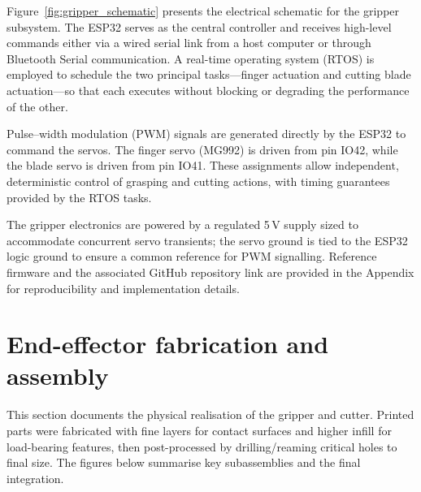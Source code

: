 Figure~\ref{fig:gripper_schematic} presents the electrical schematic for the gripper subsystem. The
ESP32 serves as the central controller and receives high-level commands either via a wired serial
link from a host computer or through Bluetooth Serial communication. A real-time operating system
(RTOS) is employed to schedule the two principal tasks—finger actuation and cutting blade
actuation—so that each executes without blocking or degrading the performance of the other.

Pulse–width modulation (PWM) signals are generated directly by the ESP32 to command the servos.
The finger servo (MG992) is driven from pin IO42, while the blade servo is driven from pin IO41.
These assignments allow independent, deterministic control of grasping and cutting actions, with
timing guarantees provided by the RTOS tasks.

The gripper electronics are powered by a regulated 5\,V supply sized to accommodate concurrent
servo transients; the servo ground is tied to the ESP32 logic ground to ensure a common reference
for PWM signalling. Reference firmware and the associated GitHub repository link are provided
in the Appendix for reproducibility and implementation details.




\section{End-effector fabrication and assembly}

This section documents the physical realisation of the gripper and cutter. Printed parts were
fabricated with fine layers for contact surfaces and higher infill for load-bearing features, then
post-processed by drilling/reaming critical holes to final size. The figures below summarise key
subassemblies and the final integration.


\begin{table}[H]
    \centering
    \caption{Bill of materials for the prototype gripper and cutter.}
    \label{tab:gripper_bom}
    \end{table}


